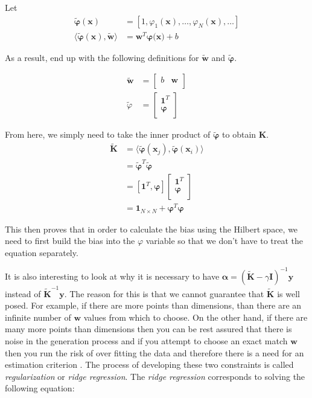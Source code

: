 \documentclass[11pt, twoside]{article}   	%
\begin{document}
Let 
\begin{align*}
\mathbf{\widetilde{\varphi}(x)} &= [1, \varphi_1(\mathbf{x}),  \ldots, \varphi_N(\mathbf{x}), \ldots ] \\
\langle\mathbf{\widetilde{\varphi}(x)}, \mathbf{\widetilde{w}} \rangle &= \mathbf{w}^T\mathbf{\varphi(\mathbf{x}}) + b 
\end{align*}

As a result, end up with the following definitions for $\mathbf{\widetilde{w}}$ and $\mathbf{\widetilde{\varphi}}$.
\newcommand{\newPhi}{\mathbf{\widetilde{\varphi}}}

\begin{align*}
 \mathbf{\widetilde{w}} &= 
\begin{bmatrix}
b & \mathbf{w}  \\
\end{bmatrix} \\
\widetilde{\varphi} &= 
\begin{bmatrix} 
\mathbf{1}^T \\
\mathbf{\varphi} \\
\end{bmatrix}
\end{align*}

From here, we simply need to take the inner product of $\mathbf{\widetilde{\varphi}}$ to obtain $\mathbf{K}$. 
\begin{align*}
 \widetilde{\mathbf{K} }&= \langle \newPhi(\mathbf{x}_j), \newPhi(\mathbf{x}_i) \rangle \\
 & = \newPhi^T\newPhi \\
 &= [\mathbf{1}^T, \mathbf{\varphi}] 
 \begin{bmatrix}
 \mathbf{1}^T \\
\mathbf{\varphi} \\
 \end{bmatrix} \\
 &= \mathbf{1}_{N \times N} + \mathbf{\varphi}^T\mathbf{\varphi}
\end{align*}

This then proves that in order to calculate the bias using the Hilbert space, we need to first
build the bias into the $\varphi$ variable so that we don't have to treat the equation separately. 

It is also interesting to look at why it is necessary to have $\mathbf{\alpha} = (\mathbf{\widetilde{K}} - \gamma \mathbf{I})^{-1} \mathbf{y}$ 
instead of $\mathbf{\widetilde{K}}^{-1}\mathbf{y}$. The reason for this is that we cannot guarantee that $\mathbf{\widetilde{K}}$ is well posed. 
For example, if there are more points than dimensions, than there are an infinite number of $\mathbf{w}$ values from which to choose. On 
the other hand, if there are many more points than dimensions then you can be rest assured that there is noise in the generation process 
and if you attempt to choose an exact match $\mathbf{w}$ then you run the risk of over fitting the data and therefore there is a need for an 
estimation criterion \cite{kernelmethods}. The process of developing these two constraints is called \emph{regularization} or \emph{ridge regression}. 
The \emph{ridge regression} corresponds to solving the following equation: 
\end{document}
